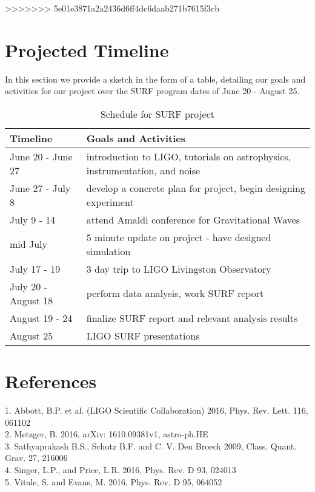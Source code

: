 \documentclass{article}
\begin{document}
>>>>>>> 5e01e3871a2a2436d6ff4dc6daab271b7615f3cb
\section{Projected Timeline}
In this section we provide a sketch in the form of a table, detailing our goals and activities for our project over the SURF program dates of June 20 - August 25. \\

\begin{table} [ht]
\caption{Schedule for SURF project}
\begin{tabular}{ p{3cm} p{10cm} }
 \hline
\centering Timeline & Goals and Activities \\ [0.5ex] 
 \hline
 \hline
June 20 - June 27 & introduction to LIGO, tutorials on astrophysics, instrumentation, and noise \\
June 27 - July 8 & develop a concrete plan for project, begin designing experiment \\
July 9 - 14 & attend Amaldi conference for Gravitational Waves \\
mid July & 5 minute update on project - have designed simulation \\
July 17 - 19 & 3 day trip to LIGO Livingston Observatory \\
July 20 - August 18 & perform data analysis, work SURF report \\
August 19 - 24 & finalize SURF report and relevant analysis results \\  
August 25 & LIGO SURF presentations \\
 \hline
\end{tabular}
\end{table}

\section{References}

1.  Abbott, B.P. et al. (LIGO Scientific Collaboration) 2016, Phys. Rev. Lett. 116, 061102 \\
2.  Metzger, B. 2016, arXiv: 1610.09381v1, astro-ph.HE \\
3.  Sathyaprakash B.S., Schutz B.F. and C. V. Den Broeck 2009, Class. Quant. Grav. 27, 216006 \\
4.  Singer, L.P., and Price, L.R. 2016, Phys. Rev. D 93, 024013 \\
5.  Vitale, S. and Evans, M. 2016, Phys. Rev. D 95, 064052 \\
  
\end{document}

